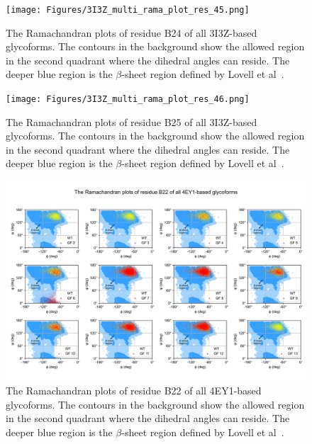 \documentclass[sn-vancouver]{sn-jnl}
\begin{document}
\renewcommand{\thefigure}{S\arabic{figure}}
\begin{figure}[H]
\centering
\texttt{[image: Figures/3I3Z\_multi\_rama\_plot\_res\_45.png]}
\caption{The Ramachandran plots of residue B24 of all 3I3Z-based glycoforms. The contours in the background show the allowed region in the second quadrant where the dihedral angles can reside. The deeper blue region is the $\beta$-sheet region defined by Lovell et al~\cite{lovell2003structure}.}
\end{figure}

\renewcommand{\thefigure}{S\arabic{figure}}
\begin{figure}[H]
\centering
\texttt{[image: Figures/3I3Z\_multi\_rama\_plot\_res\_46.png]}
\caption{The Ramachandran plots of residue B25 of all 3I3Z-based glycoforms. The contours in the background show the allowed region in the second quadrant where the dihedral angles can reside. The deeper blue region is the $\beta$-sheet region defined by Lovell et al~\cite{lovell2003structure}.}
\end{figure}

\renewcommand{\thefigure}{S\arabic{figure}}
\begin{figure}[H]
\centering
\includegraphics[width=\textwidth]{Figures/4EY1_multi_rama_plot_res_43.png}
\caption{The Ramachandran plots of residue B22 of all 4EY1-based glycoforms. The contours in the background show the allowed region in the second quadrant where the dihedral angles can reside. The deeper blue region is the $\beta$-sheet region defined by Lovell et al~\cite{lovell2003structure}.}
\end{figure}
\end{document}
